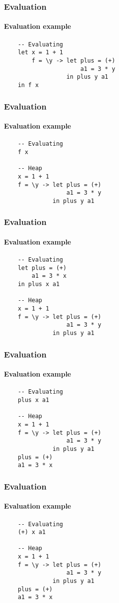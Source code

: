 \documentclass{beamer}
\begin{document}
\iffalse

\begin{frame}[fragile]
\frametitle{Evaluation}
\framesubtitle{Evaluation example}

\begin{verbatim}
    -- Evaluating
    let x = 1 + 1
        f = \y -> let plus = (+)
                      a1 = 3 * y
                  in plus y a1
    in f x
\end{verbatim}

\end{frame}

\begin{frame}[fragile]
\frametitle{Evaluation}
\framesubtitle{Evaluation example}

\begin{verbatim}
    -- Evaluating
    f x

    -- Heap
    x = 1 + 1
    f = \y -> let plus = (+)
                  a1 = 3 * y
              in plus y a1
\end{verbatim}
\end{frame}

\begin{frame}[fragile]
\frametitle{Evaluation}
\framesubtitle{Evaluation example}

\begin{verbatim}
    -- Evaluating
    let plus = (+)
        a1 = 3 * x
    in plus x a1

    -- Heap
    x = 1 + 1
    f = \y -> let plus = (+)
                  a1 = 3 * y
              in plus y a1
\end{verbatim}
\end{frame}

\begin{frame}[fragile]
\frametitle{Evaluation}
\framesubtitle{Evaluation example}

\begin{verbatim}
    -- Evaluating
    plus x a1

    -- Heap
    x = 1 + 1
    f = \y -> let plus = (+)
                  a1 = 3 * y
              in plus y a1
    plus = (+)
    a1 = 3 * x
\end{verbatim}
\end{frame}

\begin{frame}[fragile]
\frametitle{Evaluation}
\framesubtitle{Evaluation example}

\begin{verbatim}
    -- Evaluating
    (+) x a1

    -- Heap
    x = 1 + 1
    f = \y -> let plus = (+)
                  a1 = 3 * y
              in plus y a1
    plus = (+)
    a1 = 3 * x
\end{verbatim}
\end{frame}
\end{document}
